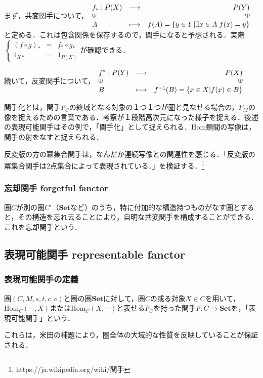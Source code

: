 \documentclass[uplatex, 12pt, a4paper, dvipdfmx]{jsarticle}
\begin{document}
まず，共変関手について，$\begin{array}{lcr}f_*:P(X)&\longrightarrow &P(Y)\\\rotatebox{90}{$\in$}& & \rotatebox{90}{$\in$} \\ A & \longmapsto & f(A)=\{ y\in Y | \exists x\in A \; f(x)=y \} \end{array}$
と定める．これは包含関係を保存するので，関手になると予想される．実際$\left\{ \begin{array}{lcr} (f\circ g)_* & = & f_*\circ g_* \\ 1_{X*} &=& 1_{P(X)} \end{array}　\right.$が確認できる．\par
続いて，反変関手について，$\begin{array}{lcr} f^* : P(Y) & \longrightarrow & P(X)\\ \rotatebox{90}{$\in$} & & \rotatebox{90}{$\in$} \\ B& \longmapsto & f^{-1}(B)=\{ x\in X | f(x)\in B \} \end{array}$

\begin{screen}関手化とは，関手$F_C$の終域となる対象の１つ１つが圏と見なせる場合の，$F_M$の像を捉えるための言葉である．考察が１段階高次元になった様子を捉える．後述の表現可能関手はその例で，「関手化」として捉えられる．Hom類間の写像は，関手の射をなすと捉えられる．
\end{screen}

反変版の方の冪集合関手は，なんだか連続写像との関連性を感じる．「反変版の冪集合関手は2点集合によって表現されている．」を検証する．\footnote{https://ja.wikipedia.org/wiki/関手}

\subsubsection{忘却関手 forgetful fanctor}
圏$C$が別の圏$C'$（$\mathbf{Set}$など）のうち，特に付加的な構造持つものがなす圏とすると，その構造を忘れ去ることにより，自明な共変関手を構成することができる．これを忘却関手という．

\subsection{表現可能関手 representable fanctor}
\subsubsection{表現可能関手の定義}
\begin{shadebox}\begin{definition}[表現可能関手]
    圏$(C,M,s,t,c,e)$と圏の圏$\mathbf{Set}$に対して，圏$C$の或る対象$X\in C$を用いて，$\mathrm{Hom}_C(-,X)$または$\mathrm{Hom}_C(X,-)$と表せる$F_C$を持った関手$F:C\longrightarrow \mathbf{Set}$を，「表現可能関手」という．
\end{definition}\end{shadebox}
これらは，米田の補題により，圏全体の大域的な性質を反映していることが保証される．
\end{document}

